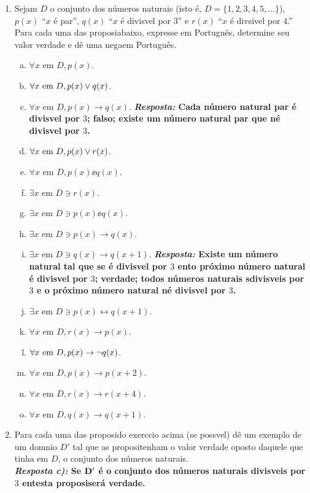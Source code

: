 \begin{enumerate}[{\bf 1.}]
\item Sejam $D$ o conjunto dos n\'umeros naturais (isto \'e, $D=\{1,2,3,4,5,...\}$), $p(x)$ ``$x$ \'e par'', $q(x)$ ``$x$ \'e divis\ih vel por $3$'' e $r(x)$ ``$x$ \'e div\ih sivel por $4$.'' Para cada uma das proposi\coes abaixo, expresse em Portugu\^es, determine seu valor verdade e d\^e uma nega\cao em Portugu\^es.  
\begin{enumerate}[a)]
\item $\forall x \textrm{ em } D, p(x)$.
\item $\forall x \textrm{ em } D, p(x)\vee q(x)$.
\item $\forall x \textrm{ em } D, p(x)\to q(x)$. {\bf{\it Resposta:} Cada n\'umero natural par \'e divis\ih vel por $3$; falso; existe um n\'umero natural par que n\ao \'e divis\ih vel por $3$.}
\item $\forall x \textrm{ em } D, p(x)\vee r(x)$.
\item $\forall x \textrm{ em } D, p(x)\ee q(x)$.
\item $\exists x \textrm{ em } D \ni r(x)$.
\item $\exists x \textrm{ em } D \ni p(x)\ee q(x)$.
\item $\exists x \textrm{ em } D \ni p(x)\to q(x)$.
\item $\exists x \textrm{ em } D \ni q(x)\to q(x+1)$. {\bf{\it Resposta:} Existe um n\'umero natural tal que se \'e divis\ih vel por $3$ ent\ao o pr\'oximo n\'umero natural \'e divis\ih vel por $3$; verdade; todos n\'umeros naturais s\ao divis\ih veis por $3$ e o pr\'oximo n\'umero natural n\ao \'e divis\ih vel por $3$.}
\item $\exists x \textrm{ em } D \ni p(x) \leftrightarrow q(x+1)$.
\item $\forall x \textrm{ em } D, r(x)\to p(x)$.
\item $\forall x \textrm{ em } D, p(x)\to\lnot q(x)$.
\item $\forall x \textrm{ em } D, p(x)\to p(x+2)$.
\item $\forall x \textrm{ em } D, r(x)\to r(x+4)$.
\item $\forall x \textrm{ em } D, q(x)\to q(x+1)$.
\end{enumerate}

\item Para cada uma das proposi\coes do exerc\ih cio acima (se poss\ih vel) d\^e um exemplo de um dom\ih nio $D'$ tal que as proposi\coes tenham o valor verdade oposto daquele que tinha em $D$, o conjunto dos n\'umeros naturais.\\
{\bf{\it Resposta c):} Se ${\bf D'}$ \'e o conjunto dos n\'umeros naturais divis\ih veis por $3$ ent\ao esta proposi\cao ser\'a verdade.}\\


\end{enumerate}
